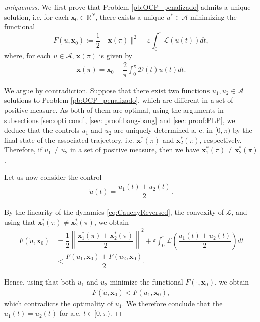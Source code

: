\documentclass[9pt,shortpaper,twoside,web]{ieeecolor}
\begin{document}
\medskip
\begin{proof}[uniqueness]
	We first prove that Problem \ref{pb:OCP_penalizado} admits a unique solution, i.e.  for each $\bm{x}_0\in \mathbb{R}^N$, there exists a unique $u^\ast\in \mathcal{A}$ minimizing the functional
	\begin{equation}\label{eq:functional F}
		F(u,\bm{x}_0) := \dfrac{1}{2} \| \bm{x}(\pi) \|^2 + \varepsilon \int_0^\pi \mathcal{L}(u(t)) dt,
	\end{equation}
	where,  for each $u\in \mathcal{A}$, $\bm{x}(\pi)$ is given by
	\begin{align*}
		\bm{x} (\pi) = \bm{x}_0  - \dfrac{2}{\pi} \int_0^\pi \bm{\mathcal{D}}(t) u(t) dt.
	\end{align*}
	
	We argue by contradiction. Suppose that there exist two functions $u_1,u_2\in\mathcal{A}$ solutions to Problem \ref{pb:OCP_penalizado}, which are different in a set of positive measure. As both of them are optimal, using the arguments in subsections \ref{sec:opti cond}, \ref{sec: proof:bang-bang} and \ref{sec: proof:PLP}, we deduce that the controls $u_1$ and $u_2$ are uniquely determined a. e. in $[0,\pi)$ by the final state of the associated trajectory, i.e. $\bm{x}_1^\ast(\pi)$ and $\bm{x}_2^\ast(\pi)$, respectively. Therefore,   if $u_1 \neq u_2$ in a set of positive measure, then we have $\bm{x}_1^\ast (\pi)\neq \bm{x}_2^\ast(\pi)$.
	
	Let us now consider the control
	\begin{align*}
		\tilde{u} (t) = \dfrac{u_1(t) + u_2(t)}{2}.
	\end{align*}
	
	By the linearity of the dynamics \eqref{eq:CauchyReversed}, the convexity of $\mathcal{L}$, and using that $\bm{x}_1^\ast(\pi) \neq \bm{x}_2^\ast(\pi)$, we obtain
	\begin{align*} 
		F(\tilde{u}, \bm{x}_0) &= \dfrac{1}{2} \left\| \dfrac{\bm{x}_1^\ast(\pi) + \bm{x}_2^\ast(\pi) }{2}\right\|^2 \!+ \varepsilon \int_0^\pi \mathcal{L} \left( \dfrac{u_1(t) + u_2(t) }{2}\right) dt \nonumber 
		\\[5pt]
		&< \dfrac{F(u_1,\bm{x}_0) + F(u_2, \bm{x}_0)}{2}. 
	\end{align*}
	
	Hence, using that both $u_1$ and $u_2$ minimize the functional $F(\cdot, \bm{x}_0)$, we obtain
	\begin{align*}
		F(\tilde{u}, \bm{x}_0) < F(u_1,\bm{x}_0),
	\end{align*}
	which contradicts the optimality of $u_1$. We therefore conclude that the $u_1 (t) =u_2(t)$ for a.e. $t\in [0,\pi)$.
\end{proof}
\end{document}
